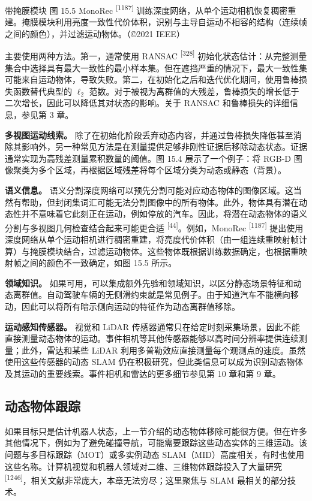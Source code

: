 带掩膜模块
图 15.5 MonoRec \textsuperscript{[1187]} 训练深度网络，从单个运动相机恢复稠密重建。掩膜模块利用亮度一致性代价体积，识别与主导自运动不相容的结构（连续帧之间的颜色），并过滤运动物体。（©2021 IEEE）

主要使用两种方法。第一，通常使用 RANSAC \textsuperscript{[328]} 初始化状态估计：从完整测量集合中选择具有最大一致性的最小样本集。但在遮挡严重的情况下，最大一致性集可能来自运动物体，导致失败。第二，在初始化之后和迭代优化期间，使用鲁棒损失函数替代典型的 $\ell_2$ 范数。对于被视为离群值的大残差，鲁棒损失的增长低于二次增长，因此可以降低其对状态的影响。关于 RANSAC 和鲁棒损失的详细信息，参见第 3 章。

\textbf{多视图运动线索。} 除了在初始化阶段丢弃动态内容，并通过鲁棒损失降低甚至消除其影响外，另一种常见方法是在测量提供足够非刚性证据后移除动态状态。证据通常实现为高残差测量累积数量的阈值。图 15.4 展示了一个例子：将 RGB-D 图像聚类为多个区域，再根据区域残差将每个区域分类为动态或静态（背景）。

\textbf{语义信息。} 语义分割深度网络可以预先分割可能对应动态物体的图像区域。这当然有帮助，但封闭集词汇可能无法分割图像中的所有物体。此外，物体具有潜在动态性并不意味着它此刻正在运动，例如停放的汽车。因此，将潜在动态物体的语义分割与多视图几何检查结合起来可能更合适 \textsuperscript{[44]}。例如，MonoRec \textsuperscript{[1187]} 提出使用深度网络从单个运动相机进行稠密重建，将亮度代价体积（由一组连续重映射帧计算）与掩膜模块结合，过滤运动物体。这些物体既根据训练数据确定，也根据重映射帧之间的颜色不一致确定，如图 15.5 所示。

\textbf{领域知识。} 如果可用，可以集成额外先验和领域知识，以区分静态场景特征和动态离群值。自动驾驶车辆的无侧滑约束就是常见例子。由于知道汽车不能横向移动，因此可以将所有暗示侧向运动的特征作为动态离群值移除。

\textbf{运动感知传感器。} 视觉和 LiDAR 传感器通常只在给定时刻采集场景，因此不能直接测量动态物体的运动。事件相机等其他传感器能够以高时间分辨率提供连续测量；此外，雷达和某些 LiDAR 利用多普勒效应直接测量每个观测点的速度。虽然使用这些传感器的动态 SLAM 仍在积极研究，但此类信息可以成为识别动态物体及其运动的重要线索。事件相机和雷达的更多细节参见第 10 章和第 9 章。

\subsection{动态物体跟踪}

如果目标只是估计机器人状态，上一节介绍的动态物体移除可能很方便。但在许多其他情况下，例如为了避免碰撞导航，可能需要跟踪这些动态实体的三维运动。该问题与多目标跟踪（MOT）或多实例动态 SLAM（MID）高度相关，有时也使用这些名称。计算机视觉和机器人领域对二维、三维物体跟踪投入了大量研究 \textsuperscript{[1246]}，相关文献非常庞大，本章无法穷尽；这里聚焦与 SLAM 最相关的部分技术。

